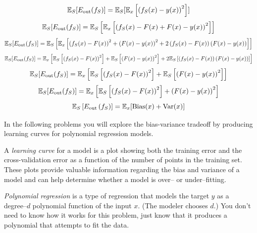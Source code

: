 \begin{solution}
  \begin{equation}
  \mathbb{E}_S[E_\text{out}(f_S)] = \mathbb{E}_S[\mathbb{E}_x\left[\left(f_S(x) - y(x)\right)^2\right]]
  \end{equation}
  \begin{equation}
    \mathbb{E}_S[E_\text{out}(f_S)] = \mathbb{E}_S\left[\mathbb{E}_x\left[\left(f_S(x)-F(x) +F(x) - y(x)\right)^2\right]\right]
  \end{equation}
  \begin{equation}
    \mathbb{E}_S[E_\text{out}(f_S)] = \mathbb{E}_S\left[\mathbb{E}_x\left[\left(f_S(x)-F(x)\right)^2 +\left(F(x) - y(x)\right)^2+2\left(f_S(x)-F(x)\right)\left(F(x) - y(x)\right)\right]\right]
  \end{equation}
  \begin{equation}
    \mathbb{E}_S[E_\text{out}(f_S)] = \mathbb{E}_x\left[\mathbb{E}_S\left[\left(f_S(x)-F(x)\right)^2\right] +\mathbb{E}_S\left[\left(F(x) - y(x)\right)^2\right]+2\mathbb{E}_S\left[\left(f_S(x)-F(x)\right)\left(F(x) - y(x)\right)\right]\right]
  \end{equation}
  \begin{equation}
    \mathbb{E}_S[E_\text{out}(f_S)] = \mathbb{E}_x\left[\mathbb{E}_S\left[\left(f_S(x)-F(x)\right)^2\right] +\mathbb{E}_S\left[\left(F(x) - y(x)\right)^2\right]\right]
  \end{equation}
  \begin{equation}
    \mathbb{E}_S[E_\text{out}(f_S)] = \mathbb{E}_x\left[\mathbb{E}_S\left[\left(f_S(x)-F(x)\right)^2\right] +\left(F(x) - y(x)\right)^2\right]
  \end{equation}
  \begin{equation}
    \mathbb{E}_S \left[E_\text{out}\left(f_S\right)\right] = \mathbb{E}_x[\operatorname{Bias}(x) + \operatorname{Var}(x)]
  \end{equation}
\end{solution}

In the following problems you will explore the bias-variance tradeoff by producing learning curves for polynomial regression models.

A \emph{learning curve} for a model is a plot showing both the training error and the cross-validation error as a function of the number of points in the training set. These plots provide valuable information regarding the bias and variance of a model and can help determine whether a model is over-- or under--fitting.

\emph{Polynomial regression} is a type of regression that models the target $y$ as a degree--$d$ polynomial function of the input $x$. (The modeler chooses $d$.)  You don't need to know how it works for this problem, just know that it produces a polynomial that attempts to fit the data.

